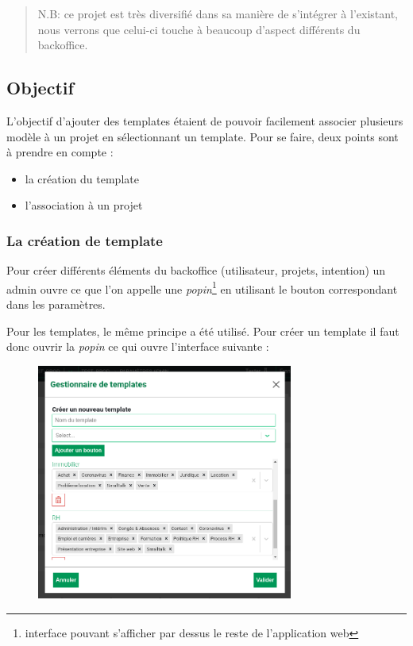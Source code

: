 \documentclass[12pt,a4paper,twoside]{scrreprt}
\begin{document}
\begin{quote}
	N.B: ce projet est très diversifié dans sa manière de s'intégrer à l'existant, nous verrons que celui-ci touche à beaucoup d'aspect différents du backoffice.
\end{quote}

\newpage
\subsection{Objectif}

L'objectif d'ajouter des templates étaient de pouvoir facilement associer plusieurs modèle à un projet en sélectionnant un template. Pour se faire, deux points sont à prendre en compte :
\begin{itemize}
	\item la création du template
	\item l'association à un projet
\end{itemize}

\subsubsection{La création de template}

Pour créer différents éléments du backoffice (utilisateur, projets, intention) un admin ouvre ce que l'on appelle une \textit{popin}\footnote{interface pouvant s'afficher par dessus le reste de l'application web} en utilisant le bouton correspondant dans les paramètres.

Pour les templates, le même principe a été utilisé. Pour créer un template il faut donc ouvrir la \textit{popin} ce qui ouvre l'interface suivante :

\begin{figure}[h!]
	\center
	\includegraphics[width=0.75\textwidth]{pictures/popin_create_templates.png}
\end{figure}
\end{document}
